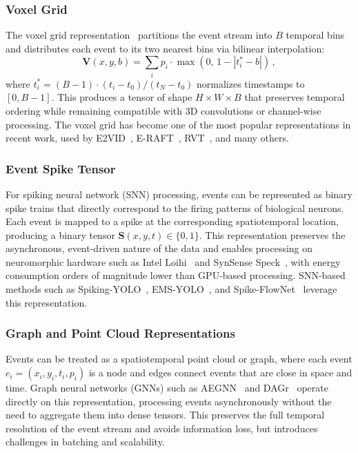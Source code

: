 \subsubsection{Voxel Grid}
\label{sec:repr_voxel}

The voxel grid representation~\cite{zhu2019unsupervised} partitions the event stream into $B$ temporal bins and distributes each event to its two nearest bins via bilinear interpolation:
\begin{equation}
\label{eq:voxel_grid}
    \mathbf{V}(x, y, b) = \sum_{i} p_i \cdot \max\left(0, \, 1 - \left| t_i^* - b \right| \right) \,,
\end{equation}
where $t_i^* = (B-1) \cdot (t_i - t_0) / (t_N - t_0)$ normalizes timestamps to $[0, B-1]$. This produces a tensor of shape $H \times W \times B$ that preserves temporal ordering while remaining compatible with 3D convolutions or channel-wise processing. The voxel grid has become one of the most popular representations in recent work, used by E2VID~\cite{rebecq2019e2vid}, E-RAFT~\cite{gehrig2021eraft}, RVT~\cite{gehrig2023rvt}, and many others.


\subsubsection{Event Spike Tensor}
\label{sec:repr_spike}

For spiking neural network (SNN) processing, events can be represented as binary spike trains that directly correspond to the firing patterns of biological neurons. Each event is mapped to a spike at the corresponding spatiotemporal location, producing a binary tensor $\mathbf{S}(x, y, t) \in \{0, 1\}$. This representation preserves the asynchronous, event-driven nature of the data and enables processing on neuromorphic hardware such as Intel Loihi~\cite{davies2018loihi} and SynSense Speck~\cite{liu2023speck}, with energy consumption orders of magnitude lower than GPU-based processing. SNN-based methods such as Spiking-YOLO~\cite{kim2020spikingyolo}, EMS-YOLO~\cite{su2023emsyolo}, and Spike-FlowNet~\cite{lee2020spikeflownet} leverage this representation.


\subsubsection{Graph and Point Cloud Representations}
\label{sec:repr_graph}

Events can be treated as a spatiotemporal point cloud or graph, where each event $e_i = (x_i, y_i, t_i, p_i)$ is a node and edges connect events that are close in space and time. Graph neural networks (GNNs) such as AEGNN~\cite{schaefer2022aegnn} and DAGr~\cite{gehrig2024dagr} operate directly on this representation, processing events asynchronously without the need to aggregate them into dense tensors. This preserves the full temporal resolution of the event stream and avoids information loss, but introduces challenges in batching and scalability.


